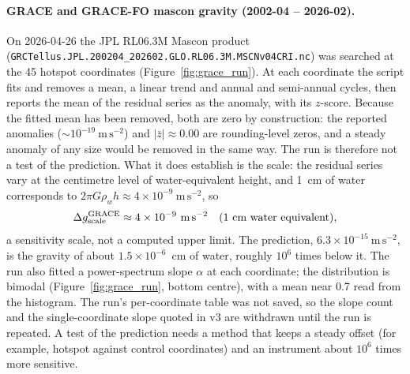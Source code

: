 \documentclass[11pt,a4paper]{article}
\begin{document}
\paragraph{GRACE and GRACE-FO mascon gravity (2002-04 -- 2026-02).}
\sloppy
On 2026-04-26 the JPL RL06.3M Mascon product~\cite{GRACE_RL06}
(\texttt{GRCTellus.JPL.200204\_202602.GLO.RL06.3M.MSCNv04CRI.nc}) was searched at the
45 hotspot coordinates (Figure~\ref{fig:grace_run}). At each coordinate the script
fits and removes a mean, a linear trend and annual and semi-annual cycles, then
reports the mean of the residual series as the anomaly, with its $z$-score. Because
the fitted mean has been removed, both are zero by construction: the reported
anomalies (${\sim}10^{-19}~\mathrm{m\,s^{-2}}$) and $|\bar z| \approx 0.00$ are
rounding-level zeros, and a steady anomaly of any size would be removed in the same
way. The run is therefore not a test of the prediction. What it does establish is
the scale: the residual series vary at the centimetre level of water-equivalent
height, and 1~cm of water corresponds to $2\pi G\rho_w h \approx
4\times10^{-9}~\mathrm{m\,s^{-2}}$, so
\begin{equation}
  \Delta g^{\mathrm{GRACE}}_{\rm scale} \approx 4\times10^{-9}~\mathrm{m\,s^{-2}}
  \quad (\text{1~cm water equivalent}),
  \label{eq:grace_ul}
\end{equation}
a sensitivity scale, not a computed upper limit. The prediction,
$6.3\times10^{-15}~\mathrm{m\,s^{-2}}$, is the gravity of about $1.5\times10^{-6}$~cm
of water, roughly $10^{6}$ times below it. The run also fitted a power-spectrum slope
$\alpha$ at each coordinate; the distribution is bimodal
(Figure~\ref{fig:grace_run}, bottom centre), with a mean near 0.7 read from the
histogram. The run's per-coordinate table was not saved, so the slope count and the
single-coordinate slope quoted in v3 are withdrawn until the run is repeated. A test
of the prediction needs a method that keeps a steady offset (for example, hotspot
against control coordinates) and an instrument about $10^{6}$ times more sensitive.
\end{document}
